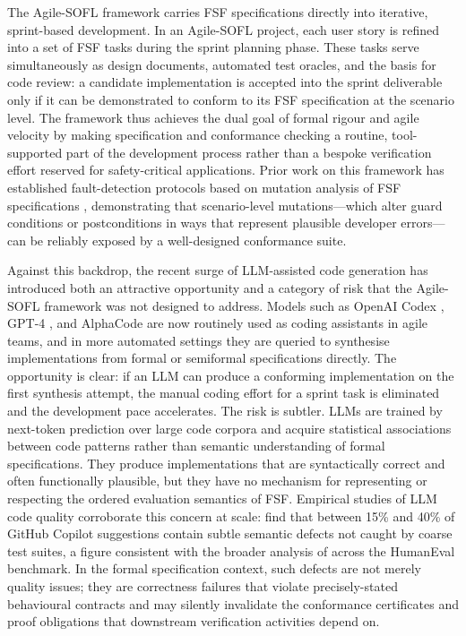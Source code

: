 The Agile-SOFL framework \citep{li2022agilesofl} carries FSF specifications directly into iterative, sprint-based development.  In an Agile-SOFL project, each user story is refined into a set of FSF tasks during the sprint planning phase.  These tasks serve simultaneously as design documents, automated test oracles, and the basis for code review: a candidate implementation is accepted into the sprint deliverable only if it can be demonstrated to conform to its FSF specification at the scenario level.  The framework thus achieves the dual goal of formal rigour and agile velocity by making specification and conformance checking a routine, tool-supported part of the development process rather than a bespoke verification effort reserved for safety-critical applications.  Prior work on this framework has established fault-detection protocols based on mutation analysis of FSF specifications \citep{li2023iet}, demonstrating that scenario-level mutations—which alter guard conditions or postconditions in ways that represent plausible developer errors—can be reliably exposed by a well-designed conformance suite.

Against this backdrop, the recent surge of LLM-assisted code generation has introduced both an attractive opportunity and a category of risk that the Agile-SOFL framework was not designed to address.  Models such as OpenAI Codex \citep{chen2021codex}, GPT-4 \citep{openai2023gpt4}, and AlphaCode \citep{li2022alphacode} are now routinely used as coding assistants in agile teams, and in more automated settings they are queried to synthesise implementations from formal or semiformal specifications directly.  The opportunity is clear: if an LLM can produce a conforming implementation on the first synthesis attempt, the manual coding effort for a sprint task is eliminated and the development pace accelerates.  The risk is subtler.  LLMs are trained by next-token prediction over large code corpora and acquire statistical associations between code patterns rather than semantic understanding of formal specifications.  They produce implementations that are syntactically correct and often functionally plausible, but they have no mechanism for representing or respecting the ordered evaluation semantics of FSF.  Empirical studies of LLM code quality corroborate this concern at scale: \citet{dakhel2023copilot} find that between 15\% and 40\% of GitHub Copilot suggestions contain subtle semantic defects not caught by coarse test suites, a figure consistent with the broader analysis of \citet{chen2021codex} across the HumanEval benchmark.  In the formal specification context, such defects are not merely quality issues; they are correctness failures that violate precisely-stated behavioural contracts and may silently invalidate the conformance certificates and proof obligations that downstream verification activities depend on.

